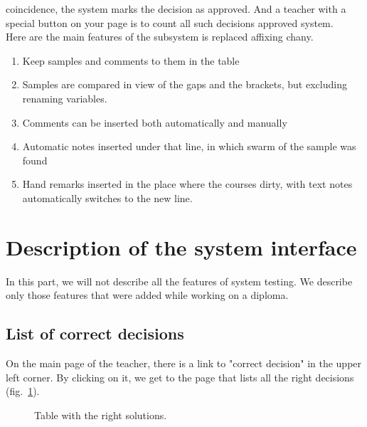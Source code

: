 \documentclass{acmtog} %
\begin{document}
coincidence, the system marks the decision as approved. And a teacher with a special button on your page is to count all such decisions approved system.\\
Here are the main features of the subsystem is replaced affixing
chany.
\begin{enumerate}
    \item Keep samples and comments to them in the table
    \item Samples are compared in view of the gaps and the brackets, but excluding
renaming variables.
    \item Comments can be inserted both automatically and manually
    \item Automatic notes inserted under that line, in which
swarm of the sample was found
    \item Hand remarks inserted in the place where the courses
dirty, with text notes automatically switches to the new
line.
\end{enumerate}

\section{Description of the system interface}
\label{sub:description_system_interface}


In this part, we will not describe all the features of system testing. We describe only those features that were added
while working on a diploma.


\subsection{List of correct decisions}
\label{subsub:list_correct_decisions}
%
On the main page of the teacher, there is a link to "correct decision" in the upper left corner. By clicking on it, we get to the page that lists all the right decisions (fig.~\ref{correct}). \\
\begin{figure}[h]
\caption{Table with the right solutions.}
\label{correct}
\end{figure}
\end{document}
